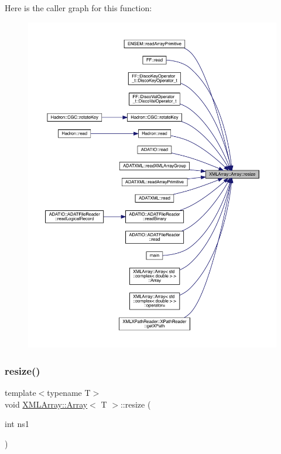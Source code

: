 Here is the caller graph for this function\+:
\nopagebreak
\begin{figure}[H]
\begin{center}
\leavevmode
\includegraphics[width=350pt]{db/d6c/classXMLArray_1_1Array_a470913fde270ad0e578041654e2390f0_icgraph}
\end{center}
\end{figure}
\mbox{\label{classXMLArray_1_1Array_a470913fde270ad0e578041654e2390f0}} 
\subsubsection{\texorpdfstring{resize()}{resize()}\hspace{0.1cm}{\footnotesize\ttfamily [2/2]}}
{\footnotesize\ttfamily template$<$typename T$>$ \\
void \mbox{\hyperlink{classXMLArray_1_1Array}{X\+M\+L\+Array\+::\+Array}}$<$ T $>$\+::resize (\begin{DoxyParamCaption}\item[{int}]{ns1 }\end{DoxyParamCaption})\hspace{0.3cm}{\ttfamily [inline]}}



